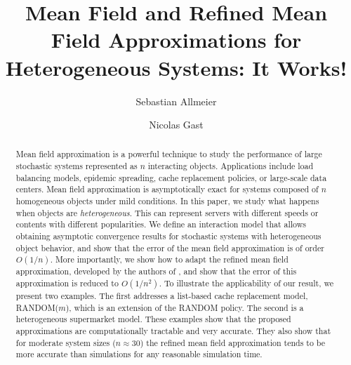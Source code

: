 \documentclass[acmsmall]{acmart}
\begin{document}
\title[Mean Field Approximation(s) for Heterogeneous Systems: It Works!]{Mean Field and Refined Mean Field Approximations for Heterogeneous Systems: It Works!}

\author{Sebastian Allmeier}
\author{Nicolas Gast}

\renewcommand{\shortauthors}{Allmeier and Gast}

\begin{abstract}
  Mean field approximation is a powerful technique to study the performance of large stochastic systems represented as $n$ interacting objects. Applications include load balancing models, epidemic spreading, cache replacement policies, or large-scale data centers. Mean field approximation is asymptotically exact for systems composed of $n$ homogeneous objects under mild conditions. In this paper, we study what happens when objects are \emph{heterogeneous}. This can represent servers with different speeds or contents with different popularities. We define an interaction model that allows obtaining asymptotic convergence results for stochastic systems with heterogeneous object behavior, and show that the error of the mean field approximation is of order $O(1/n)$. More importantly, we show how to adapt the refined mean field approximation, developed by the authors of \cite{gastSizeExpansionsMean2019}, and show that the error of this approximation is reduced to $O(1/n^2)$. To illustrate the applicability of our result, we present two examples. The first addresses a list-based cache replacement model, RANDOM($m$), which is an extension of the RANDOM policy. The second is a heterogeneous supermarket model. These examples show that the proposed approximations are computationally tractable and very accurate. They also show that for moderate system sizes ($n\approx30$) the refined mean field approximation tends to be more accurate than simulations for any reasonable simulation time.
\end{abstract}
\end{document}
